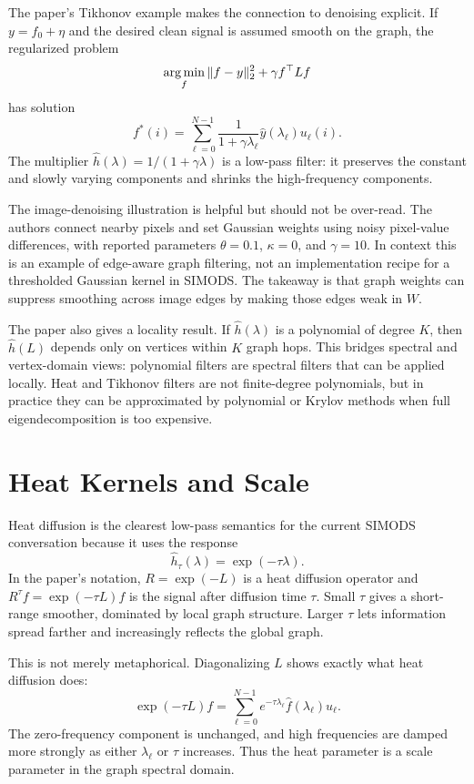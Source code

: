 \documentclass[11pt]{article}
\begin{document}
The paper's Tikhonov example makes the connection to denoising explicit.  If
$y=f_0+\eta$ and the desired clean signal is assumed smooth on the graph, the
regularized problem
\[
  \operatorname*{arg\,min}_f \|f-y\|_2^2 + \gamma f^\top L f
\]
has solution
\[
  f^\ast(i)
  =
  \sum_{\ell=0}^{N-1}
  \frac{1}{1+\gamma\lambda_\ell}
  \hat y(\lambda_\ell)u_\ell(i).
\]
The multiplier $\hat h(\lambda)=1/(1+\gamma\lambda)$ is a low-pass filter:
it preserves the constant and slowly varying components and shrinks the
high-frequency components.

The image-denoising illustration is helpful but should not be over-read.  The
authors connect nearby pixels and set Gaussian weights using noisy
pixel-value differences, with reported parameters $\theta=0.1$, $\kappa=0$,
and $\gamma=10$.  In context this is an example of edge-aware graph filtering,
not an implementation recipe for a thresholded Gaussian kernel in SIMODS.  The
takeaway is that graph weights can suppress smoothing across image edges by
making those edges weak in $W$.

The paper also gives a locality result.  If $\hat h(\lambda)$ is a polynomial
of degree $K$, then $\hat h(L)$ depends only on vertices within $K$ graph hops.
This bridges spectral and vertex-domain views: polynomial filters are
spectral filters that can be applied locally.  Heat and Tikhonov filters are
not finite-degree polynomials, but in practice they can be approximated by
polynomial or Krylov methods when full eigendecomposition is too expensive.

\section{Heat Kernels and Scale}

Heat diffusion is the clearest low-pass semantics for the current SIMODS
conversation because it uses the response
\[
  \hat h_\tau(\lambda)=\exp(-\tau\lambda).
\]
In the paper's notation, $R=\exp(-L)$ is a heat diffusion operator and
$R^\tau f=\exp(-\tau L)f$ is the signal after diffusion time $\tau$.  Small
$\tau$ gives a short-range smoother, dominated by local graph structure.
Larger $\tau$ lets information spread farther and increasingly reflects the
global graph.

This is not merely metaphorical.  Diagonalizing $L$ shows exactly what heat
diffusion does:
\[
  \exp(-\tau L)f
  =
  \sum_{\ell=0}^{N-1}
  e^{-\tau\lambda_\ell}\hat f(\lambda_\ell)u_\ell.
\]
The zero-frequency component is unchanged, and high frequencies are damped
more strongly as either $\lambda_\ell$ or $\tau$ increases.  Thus the heat
parameter is a scale parameter in the graph spectral domain.
\end{document}
